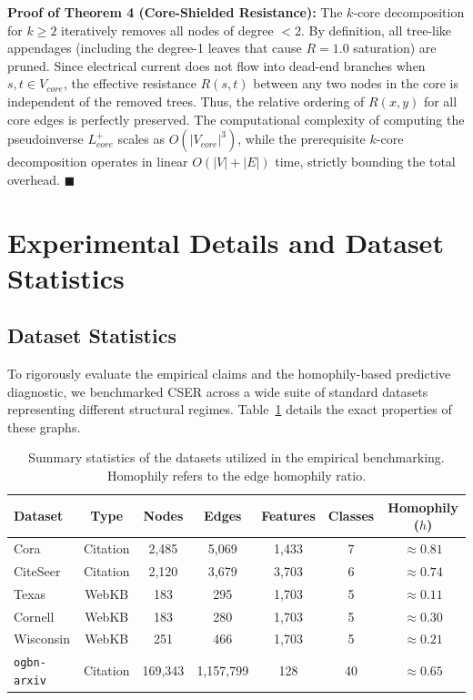\documentclass[10pt]{article} %
\begin{document}
\textbf{Proof of Theorem 4 (Core-Shielded Resistance):} The $k$-core decomposition for $k \ge 2$ iteratively removes all nodes of degree $< 2$. By definition, all tree-like appendages (including the degree-1 leaves that cause $R=1.0$ saturation) are pruned. Since electrical current does not flow into dead-end branches when $s, t \in V_{core}$, the effective resistance $R(s,t)$ between any two nodes in the core is independent of the removed trees. Thus, the relative ordering of $R(x,y)$ for all core edges is perfectly preserved. The computational complexity of computing the pseudoinverse $L_{core}^+$ scales as $O(|V_{core}|^3)$, while the prerequisite $k$-core decomposition \citep{Batagelj2003} operates in linear $O(|V| + |E|)$ time, strictly bounding the total overhead. $\blacksquare$

\section{Experimental Details and Dataset Statistics}
\label{app:hyperparams}

\subsection{Dataset Statistics}
To rigorously evaluate the empirical claims and the homophily-based predictive diagnostic, we benchmarked CSER across a wide suite of standard datasets representing different structural regimes. Table~\ref{tab:datasets} details the exact properties of these graphs.

\begin{table}[h]
\centering
\begin{tabular}{lcccccc}
\hline
\textbf{Dataset} & \textbf{Type} & \textbf{Nodes} & \textbf{Edges} & \textbf{Features} & \textbf{Classes} & \textbf{Homophily ($h$)} \\
\hline
Cora & Citation & 2,485 & 5,069 & 1,433 & 7 & $\approx 0.81$ \\
CiteSeer & Citation & 2,120 & 3,679 & 3,703 & 6 & $\approx 0.74$ \\
Texas & WebKB & 183 & 295 & 1,703 & 5 & $\approx 0.11$ \\
Cornell & WebKB & 183 & 280 & 1,703 & 5 & $\approx 0.30$ \\
Wisconsin & WebKB & 251 & 466 & 1,703 & 5 & $\approx 0.21$ \\
\texttt{ogbn-arxiv} & Citation & 169,343 & 1,157,799 & 128 & 40 & $\approx 0.65$ \\
\hline
\end{tabular}
\caption{Summary statistics of the datasets utilized in the empirical benchmarking. Homophily refers to the edge homophily ratio.}
\label{tab:datasets}
\end{table}
\end{document}
